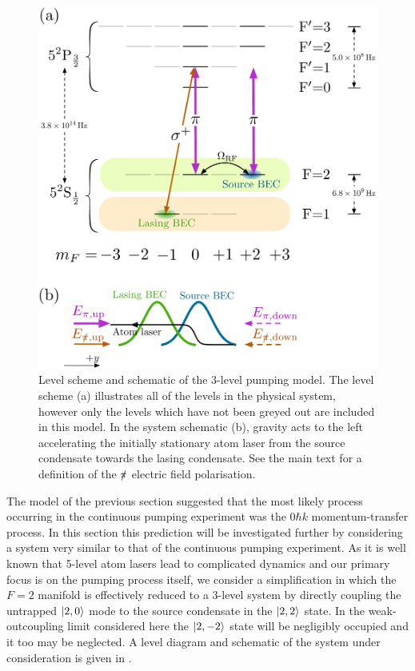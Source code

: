 \begin{figure}
    \centering
    \includegraphics[width=13cm]{3LevelModelLevelDiagram}
    \caption{Level scheme and schematic of the 3-level pumping model.  
    The level scheme (a) illustrates all of the levels in the physical system, however only the levels which have not been greyed out are included in this model.  
    In the system schematic (b), gravity acts to the left accelerating the initially stationary atom laser from the source condensate towards the lasing condensate.  See the main text for a definition of the $\slashed{\pi}$ electric field polarisation.}
    \label{OpticalPumping:3LevelModelLevelDiagram}
\end{figure}

The model of the previous section suggested that the most likely process occurring in the continuous pumping experiment was the $0 \hbar k$ momentum-transfer process.  In this section this prediction will be investigated further by considering a system very similar to that of the continuous pumping experiment.  As it is well known that 5-level atom lasers lead to complicated dynamics \citep{Dugue:2007fk} and our primary focus is on the pumping process itself, we consider a simplification in which the $F=2$ manifold is effectively reduced to a 3-level system by directly coupling the untrapped ${\left|2, 0\right>}$ mode to the source condensate in the ${\left|2, 2\right>}$ state.  In the weak-outcoupling limit considered here the ${\left|2, -2\right>}$ state will be negligibly occupied and it too may be neglected.  A level diagram and schematic of the system under consideration is given in .  

